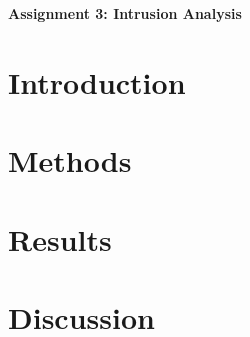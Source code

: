 \centerline{\LARGE{\textbf{Assignment 3: Intrusion Analysis}}}
\setcounter{section}{0}
\section{Introduction}
\blindtext
\section{Methods}
\section{Results}
\section{Discussion}